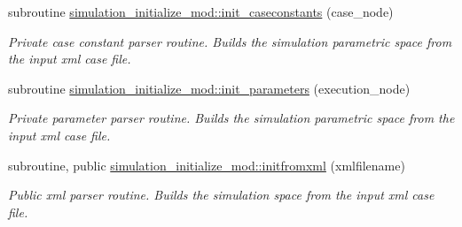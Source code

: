 \begin{DoxyCompactItemize}
subroutine \mbox{\hyperlink{namespacesimulation__initialize__mod_a97705c918360827c6fc76170b5eeb9bb}{simulation\+\_\+initialize\+\_\+mod\+::init\+\_\+caseconstants}} (case\+\_\+node)
\begin{DoxyCompactList}\small\item\em Private case constant parser routine. Builds the simulation parametric space from the input xml case file. \end{DoxyCompactList}\item 
subroutine \mbox{\hyperlink{namespacesimulation__initialize__mod_a4ee29d81788bb77840a67af18784da66}{simulation\+\_\+initialize\+\_\+mod\+::init\+\_\+parameters}} (execution\+\_\+node)
\begin{DoxyCompactList}\small\item\em Private parameter parser routine. Builds the simulation parametric space from the input xml case file. \end{DoxyCompactList}\item 
subroutine, public \mbox{\hyperlink{namespacesimulation__initialize__mod_aa596874d438807298121982eaa129d3a}{simulation\+\_\+initialize\+\_\+mod\+::initfromxml}} (xmlfilename)
\begin{DoxyCompactList}\small\item\em Public xml parser routine. Builds the simulation space from the input xml case file. \end{DoxyCompactList}\end{DoxyCompactItemize}
